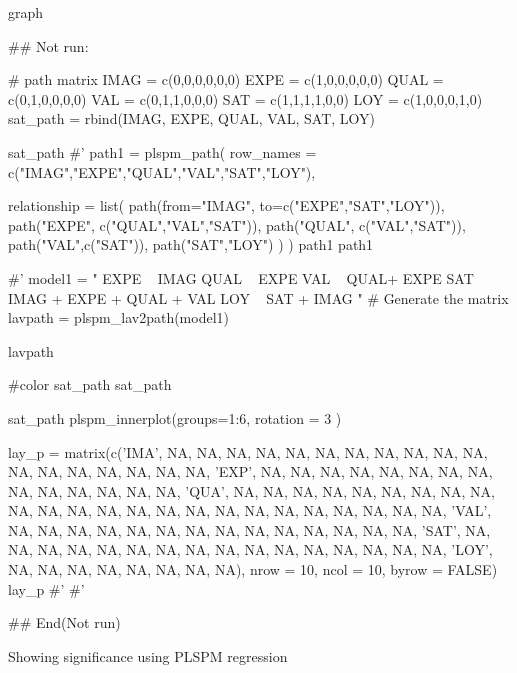 \documentclass[a4paper]{book}
\begin{document}
%
\begin{Value}
graph
\end{Value}
%
\begin{Examples}
\begin{ExampleCode}

## Not run: 

# path matrix
IMAG = c(0,0,0,0,0,0)
EXPE = c(1,0,0,0,0,0)
QUAL = c(0,1,0,0,0,0)
VAL = c(0,1,1,0,0,0)
SAT = c(1,1,1,1,0,0)
LOY = c(1,0,0,0,1,0)
sat_path = rbind(IMAG, EXPE, QUAL, VAL, SAT, LOY)

sat_path%
#'
path1 = plspm_path(
  row_names = c("IMAG","EXPE","QUAL","VAL","SAT","LOY"),

  relationship = list(
    path(from="IMAG", to=c("EXPE","SAT","LOY")),
    path("EXPE", c("QUAL","VAL","SAT")),
    path("QUAL", c("VAL","SAT")),
    path("VAL",c("SAT")),
    path("SAT","LOY")
  )
)
path1
path1%

#'
model1 = "
EXPE ~ IMAG
QUAL ~ EXPE
VAL ~  QUAL+ EXPE
SAT ~ IMAG + EXPE + QUAL + VAL
LOY ~ SAT + IMAG
"
# Generate the matrix
lavpath = plspm_lav2path(model1)


lavpath%

#color
sat_path %
sat_path %


sat_path %
 plspm_innerplot(groups=1:6, rotation = 3 )


lay_p = matrix(c('IMA', NA, NA, NA, NA, NA, NA, NA,
                 NA, NA, NA, NA, NA, NA, NA, NA, NA, NA, NA, 'EXP', NA,
                 NA, NA, NA, NA, NA, NA, NA, NA, NA, NA, NA, NA, NA, 'QUA',
                 NA, NA, NA, NA, NA, NA, NA, NA, NA, NA, NA, NA, NA, NA, NA,
                 NA, NA, NA, NA, NA, NA, NA, NA, NA, 'VAL', NA, NA, NA, NA,
                 NA, NA, NA, NA, NA, NA, NA, NA, NA, NA, 'SAT', NA, NA, NA,
                 NA, NA, NA, NA, NA, NA, NA, NA, NA, NA, NA, NA, NA, 'LOY',
                 NA, NA, NA, NA, NA, NA, NA, NA),
               nrow = 10, ncol = 10, byrow = FALSE)
lay_p
#'
#'

## End(Not run)


\end{ExampleCode}
\end{Examples}
%
\begin{Description}
Showing significance using PLSPM regression
\end{Description}
\end{document}
